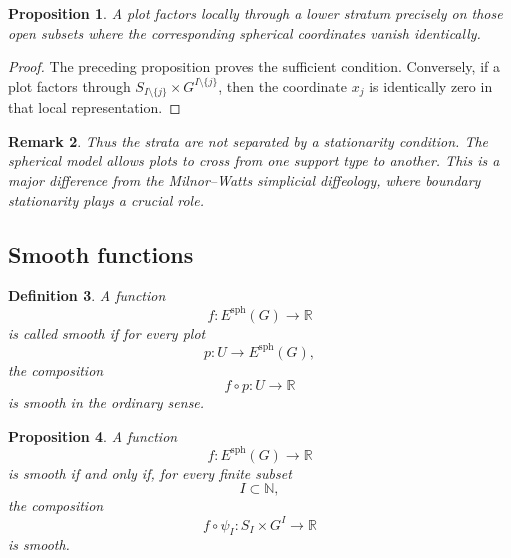 \documentclass[11pt]{amsart}
\newtheorem{definition}{Definition}[section]
\newtheorem{proposition}[definition]{Proposition}
\newtheorem{remark}[definition]{Remark}
\begin{document}
\begin{proposition}
A plot factors locally through a lower stratum precisely on those open subsets
where the corresponding spherical coordinates vanish identically.
\end{proposition}

\begin{proof}
The preceding proposition proves the sufficient condition. Conversely, if a
plot factors through \(S_{I\setminus\{j\}}\times G^{I\setminus\{j\}}\), then
the coordinate \(x_j\) is identically zero in that local representation.
\end{proof}

\begin{remark}
Thus the strata are not separated by a stationarity condition. The spherical
model allows plots to cross from one support type to another. This is a major
difference from the Milnor--Watts simplicial diffeology, where boundary
stationarity plays a crucial role.
\end{remark}
\subsection{Smooth functions}

\begin{definition}
A function
\[
f:E^{\mathrm{sph}}(G)\to\mathbb R
\]
is called smooth if for every plot
\[
p:U\to E^{\mathrm{sph}}(G),
\]
the composition
\[
f\circ p:U\to\mathbb R
\]
is smooth in the ordinary sense.
\end{definition}

\begin{proposition}
A function
\[
f:E^{\mathrm{sph}}(G)\to\mathbb R
\]
is smooth if and only if, for every finite subset
\[
I\subset\mathbb N,
\]
the composition
\[
f\circ\psi_I:S_I\times G^I\to\mathbb R
\]
is smooth.
\end{proposition}
\end{document}

